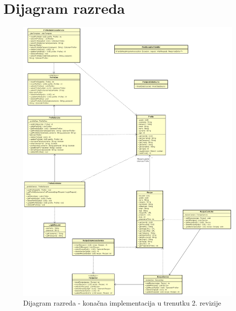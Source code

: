 			\eject
			
			
		\section{Dijagram razreda}
			

 \begin{figure}[H]
			    \centering
			    \includegraphics[width=1\linewidth]{slike/dijagrami/Dijagram razreda.png}
			    \caption{Dijagram razreda - konačna implementacija u trenutku 2. revizije}
			    \label{fig:enter-label}
			\end{figure}
   \eject
			
